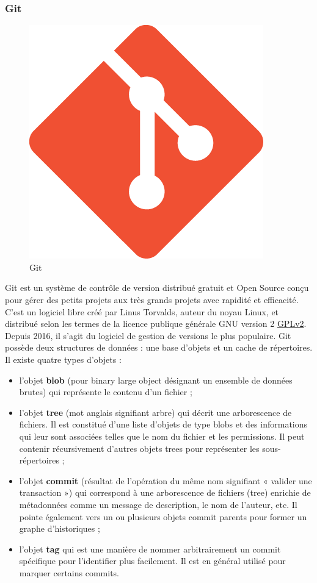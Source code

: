 \subsubsection{Git}
\begin{figure}[h]
	\includegraphics[scale=0.3]{./Template LaTeX/Images/Git-Icon.png}
	\centering
	\caption{Git}
\end{figure}
Git est un système de contrôle de version distribué gratuit et Open Source conçu pour gérer des
petits projets aux très grands projets avec rapidité et efficacité. C'est un logiciel libre créé par
Linus Torvalds, auteur du noyau Linux, et distribué selon les termes de la licence publique
générale GNU version 2 \href{https://edu.casio.com/support/fr/gplv2.html}{GPLv2}. Depuis 2016, il s’agit du logiciel de gestion de versions le
plus populaire. Git possède deux structures de données : une base d'objets et un cache de
répertoires. Il existe quatre types d'objets :
\begin{itemize}[label=$\ast$]
	
	\item  l'objet \textbf{blob} (pour binary large object désignant un ensemble de données brutes) qui
	représente le contenu d'un fichier ;
	\item l'objet \textbf{tree} (mot anglais signifiant arbre) qui décrit une arborescence de fichiers. Il est
	constitué d'une liste d'objets de type blobs et des informations qui leur sont associées
	telles que le nom du fichier et les permissions. Il peut contenir récursivement d'autres
	objets trees pour représenter les sous-répertoires ;
	\item l'objet \textbf{commit} (résultat de l'opération du même nom signifiant « valider une transaction
	») qui correspond à une arborescence de fichiers (tree) enrichie de métadonnées comme
	un message de description, le nom de l'auteur, etc. Il pointe également vers un ou
	plusieurs objets commit parents pour former un graphe d'historiques ;
	\item l'objet \textbf{tag} qui est une manière de nommer arbitrairement un commit
	spécifique pour l'identifier plus facilement. Il est en général utilisé pour marquer certains
	commits.
	
\end{itemize}


